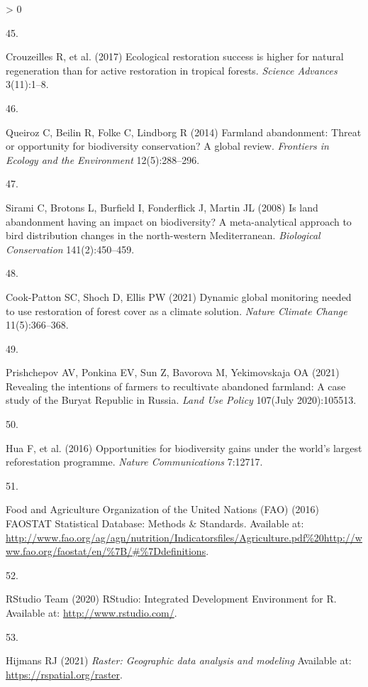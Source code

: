 \documentclass[9pt,twocolumn,twoside,]{pnas-new}
\newlength{\csllabelwidth}
\newlength{\cslhangindent}
\newenvironment{CSLReferences}[2] %
 {%
  \setlength{\parindent}{0pt}
  \ifodd #1 \everypar{\setlength{\hangindent}{\cslhangindent}}\ignorespaces\fi
  \ifnum #2 > 0
  \setlength{\parskip}{#2\baselineskip}
  \fi
 }%
 {}
\newcommand{\CSLLeftMargin}[1]{\parbox[t]{\csllabelwidth}{#1}}
\newcommand{\CSLRightInline}[1]{\parbox[t]{\linewidth - \csllabelwidth}{#1}\break}
\begin{document}
\begin{CSLReferences}{0}{0}
\leavevmode\hypertarget{ref-Crouzeilles2017}{}%
\CSLLeftMargin{45. }
\CSLRightInline{Crouzeilles R, et al. (2017) {Ecological restoration success is higher for natural regeneration than for active restoration in tropical forests}. \emph{Science Advances} 3(11):1--8.}

\leavevmode\hypertarget{ref-Queiroz2014}{}%
\CSLLeftMargin{46. }
\CSLRightInline{Queiroz C, Beilin R, Folke C, Lindborg R (2014) {Farmland abandonment: Threat or opportunity for biodiversity conservation? A global review}. \emph{Frontiers in Ecology and the Environment} 12(5):288--296.}

\leavevmode\hypertarget{ref-Sirami2008}{}%
\CSLLeftMargin{47. }
\CSLRightInline{Sirami C, Brotons L, Burfield I, Fonderflick J, Martin JL (2008) {Is land abandonment having an impact on biodiversity? A meta-analytical approach to bird distribution changes in the north-western Mediterranean}. \emph{Biological Conservation} 141(2):450--459.}

\leavevmode\hypertarget{ref-Cook-Patton2021}{}%
\CSLLeftMargin{48. }
\CSLRightInline{Cook-Patton SC, Shoch D, Ellis PW (2021) {Dynamic global monitoring needed to use restoration of forest cover as a climate solution}. \emph{Nature Climate Change} 11(5):366--368.}

\leavevmode\hypertarget{ref-Prishchepov2021a}{}%
\CSLLeftMargin{49. }
\CSLRightInline{Prishchepov AV, Ponkina EV, Sun Z, Bavorova M, Yekimovskaja OA (2021) {Revealing the intentions of farmers to recultivate abandoned farmland: A case study of the Buryat Republic in Russia}. \emph{Land Use Policy} 107(July 2020):105513.}

\leavevmode\hypertarget{ref-Hua2016}{}%
\CSLLeftMargin{50. }
\CSLRightInline{Hua F, et al. (2016) {Opportunities for biodiversity gains under the world's largest reforestation programme}. \emph{Nature Communications} 7:12717.}

\leavevmode\hypertarget{ref-FAO2016}{}%
\CSLLeftMargin{51. }
\CSLRightInline{Food and Agriculture Organization of the United Nations (FAO) (2016) {FAOSTAT Statistical Database: Methods {\&} Standards}. Available at: \url{http://www.fao.org/ag/agn/nutrition/Indicatorsfiles/Agriculture.pdf\%20http://www.fao.org/faostat/en/\%7B/\#\%7Ddefinitions}.}

\leavevmode\hypertarget{ref-RStudio}{}%
\CSLLeftMargin{52. }
\CSLRightInline{RStudio Team (2020) {RStudio: Integrated Development Environment for R}. Available at: \url{http://www.rstudio.com/}.}

\leavevmode\hypertarget{ref-R-raster}{}%
\CSLLeftMargin{53. }
\CSLRightInline{Hijmans RJ (2021) \emph{Raster: Geographic data analysis and modeling} Available at: \url{https://rspatial.org/raster}.}


\end{CSLReferences}
\end{document}
